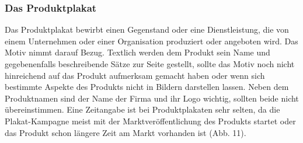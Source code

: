 \documentclass[a4paper,12pt,ngerman]{article}
\begin{document}
\subsubsection{Das Produktplakat}
Das Produktplakat bewirbt einen Gegenstand oder eine Dienstleistung, die von einem Unternehmen oder einer Organisation produziert oder angeboten wird. Das Motiv nimmt darauf Bezug. Textlich werden dem Produkt sein Name und gegebenenfalls beschreibende Sätze zur Seite gestellt, sollte das Motiv noch nicht hinreichend auf das Produkt aufmerksam gemacht haben oder wenn sich bestimmte Aspekte des Produkts nicht in Bildern darstellen lassen. Neben dem Produktnamen sind der Name der Firma und ihr Logo wichtig, sollten beide nicht übereinstimmen. Eine Zeitangabe ist bei Produktplakaten sehr selten, da die Plakat-Kampagne meist mit der Marktveröffentlichung des Produkts startet oder das Produkt schon längere Zeit am Markt vorhanden ist (Abb. 11). \\
\end{document}
